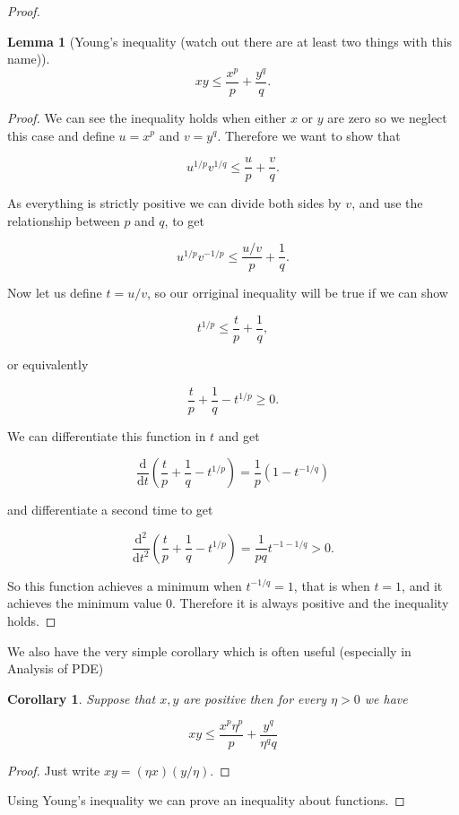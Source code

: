 \documentclass[
]{book}
\newtheorem{lemma}{Lemma}[chapter]
\newtheorem{corollary}{Corollary}[chapter]
\theoremstyle{definition}
\theoremstyle{definition}
\theoremstyle{definition}
\theoremstyle{definition}
\theoremstyle{remark}
\begin{document}
\begin{proof}
\begin{lemma}[Young's inequality (watch out there are at least two things with this name)]
\[ xy \leq \frac{x^p}{p} + \frac{y^q}{q}. \]
\end{lemma}

\begin{proof}
We can see the inequality holds when either \(x\) or \(y\) are zero so we neglect this case and define \(u = x^p\) and \(v = y^q\). Therefore we want to show that

\[ u^{1/p}v^{1/q} \leq \frac{u}{p} + \frac{v}{q}. \]

As everything is strictly positive we can divide both sides by \(v\), and use the relationship between \(p\) and \(q\), to get

\[ u^{1/p}v^{-1/p} \leq \frac{u/v}{p} + \frac{1}{q}. \]

Now let us define \(t = u/v\), so our orriginal inequality will be true if we can show

\[ t^{1/p} \leq \frac{t}{p} + \frac{1}{q}, \]

or equivalently

\[ \frac{t}{p} + \frac{1}{q} - t^{1/p} \geq 0. \]

We can differentiate this function in \(t\) and get

\[ \frac{\mathrm{d}}{\mathrm{d}t} \left(  \frac{t}{p} + \frac{1}{q} - t^{1/p}\right) = \frac{1}{p}(1- t^{-1/q}) \]

and differentiate a second time to get

\[  \frac{\mathrm{d}^2}{\mathrm{d}t^2} \left(  \frac{t}{p} + \frac{1}{q} - t^{1/p}\right)  =\frac{1}{pq} t^{-1-1/q} >0.\]

So this function achieves a minimum when \(t^{-1/q} = 1\), that is when \(t=1\), and it achieves the minimum value 0. Therefore it is always positive and the inequality holds.
\end{proof}

We also have the very simple corollary which is often useful (especially in Analysis of PDE)

\begin{corollary}
Suppose that \(x,y\) are positive then for every \(\eta >0\) we have

\[ xy \leq \frac{x^p \eta^p}{p} + \frac{y^q}{\eta^q q} \]
\end{corollary}

\begin{proof}
Just write \(xy = (\eta x)(y/\eta)\).
\end{proof}

Using Young's inequality we can prove an inequality about functions.


\end{proof}
\end{document}
